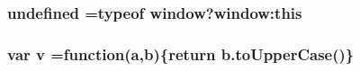 \subsubsection[{\texorpdfstring{undefined}{undefined}}]{\setlength{\rightskip}{0pt plus 5cm}undefined =typeof window?window\+:this}\hypertarget{jquery-3_8js_ae21cc36bf0d65014c717a481a3f8a468}{}\label{jquery-3_8js_ae21cc36bf0d65014c717a481a3f8a468}
\subsubsection[{\texorpdfstring{v}{v}}]{\setlength{\rightskip}{0pt plus 5cm}var v =function({\bf a},{\bf b})\{return b.\+to\+Upper\+Case()\}}\hypertarget{jquery-3_8js_afc3dd12de12777f6e20b4c93b7e7cb96}{}\label{jquery-3_8js_afc3dd12de12777f6e20b4c93b7e7cb96}
